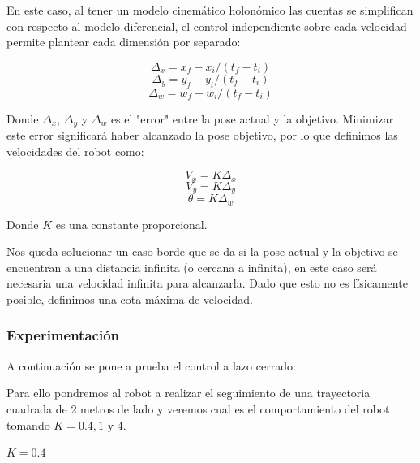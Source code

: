 En este caso, al tener un modelo cinemático holonómico las cuentas se simplifican con respecto al modelo diferencial, el control independiente sobre cada velocidad permite plantear cada  dimensión por separado:

$$\Delta_x = x_f - x_i / (t_f - t_i)$$
$$\Delta_y = y_f - y_i / (t_f - t_i)$$
$$\Delta_w = w_f - w_i / (t_f - t_i)$$

Donde $\Delta_x$, $\Delta_y$ y $\Delta_w$ es el "error" entre la pose actual y la objetivo. Minimizar este error significará haber alcanzado la pose objetivo, por lo que definimos las velocidades del robot como:

$$V_x = K \Delta_x $$
$$V_y = K \Delta_y $$
$$\theta = K \Delta_w $$

Donde $K$ es una constante proporcional.


Nos queda solucionar un caso borde que se da si la pose actual y la objetivo se encuentran a una distancia infinita (o cercana a infinita), en este caso será necesaria una velocidad infinita para alcanzarla. Dado que esto no es físicamente posible, definimos una cota máxima de velocidad.


\subsubsection{Experimentación}

A continuación se pone a prueba el control a lazo cerrado:

Para ello pondremos al robot a realizar el seguimiento de una trayectoria cuadrada de 2 metros de lado y veremos cual es el comportamiento del robot tomando $K=0.4,1$ y $4$.

$K = 0.4$

